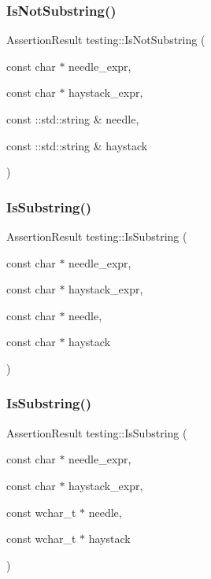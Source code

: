 \mbox{\label{namespacetesting_abe7b3fa1c9528745f934d4a14155ea87}} 
\subsubsection{\texorpdfstring{IsNotSubstring()}{IsNotSubstring()}\hspace{0.1cm}{\footnotesize\ttfamily [3/3]}}
{\footnotesize\ttfamily Assertion\+Result testing\+::\+Is\+Not\+Substring (\begin{DoxyParamCaption}\item[{const char $\ast$}]{needle\+\_\+expr,  }\item[{const char $\ast$}]{haystack\+\_\+expr,  }\item[{const \+::std\+::string \&}]{needle,  }\item[{const \+::std\+::string \&}]{haystack }\end{DoxyParamCaption})}

\mbox{\label{namespacetesting_a390c4f66fe7e9098117eb77e5fffa4ad}} 
\subsubsection{\texorpdfstring{IsSubstring()}{IsSubstring()}\hspace{0.1cm}{\footnotesize\ttfamily [1/3]}}
{\footnotesize\ttfamily Assertion\+Result testing\+::\+Is\+Substring (\begin{DoxyParamCaption}\item[{const char $\ast$}]{needle\+\_\+expr,  }\item[{const char $\ast$}]{haystack\+\_\+expr,  }\item[{const char $\ast$}]{needle,  }\item[{const char $\ast$}]{haystack }\end{DoxyParamCaption})}

\mbox{\label{namespacetesting_aa1c82529c7591d2a9fd016de45dd9113}} 
\subsubsection{\texorpdfstring{IsSubstring()}{IsSubstring()}\hspace{0.1cm}{\footnotesize\ttfamily [2/3]}}
{\footnotesize\ttfamily Assertion\+Result testing\+::\+Is\+Substring (\begin{DoxyParamCaption}\item[{const char $\ast$}]{needle\+\_\+expr,  }\item[{const char $\ast$}]{haystack\+\_\+expr,  }\item[{const wchar\+\_\+t $\ast$}]{needle,  }\item[{const wchar\+\_\+t $\ast$}]{haystack }\end{DoxyParamCaption})}

